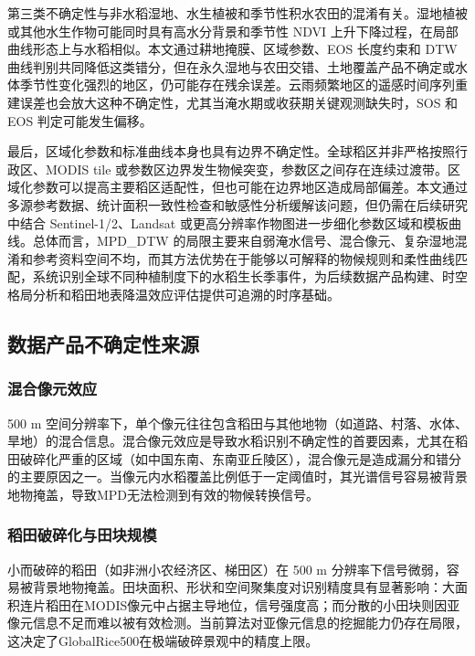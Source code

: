 第三类不确定性与非水稻湿地、水生植被和季节性积水农田的混淆有关。湿地植被或其他水生作物可能同时具有高水分背景和季节性 NDVI 上升下降过程，在局部曲线形态上与水稻相似\cite{Zhan2021}。本文通过耕地掩膜、区域参数、EOS 长度约束和 DTW 曲线判别共同降低这类错分，但在永久湿地与农田交错、土地覆盖产品不确定或水体季节性变化强烈的地区，仍可能存在残余误差。云雨频繁地区的遥感时间序列重建误差也会放大这种不确定性，尤其当淹水期或收获期关键观测缺失时，SOS 和 EOS 判定可能发生偏移。

最后，区域化参数和标准曲线本身也具有边界不确定性。全球稻区并非严格按照行政区、MODIS tile 或参数区边界发生物候突变，参数区之间存在连续过渡带。区域化参数可以提高主要稻区适配性，但也可能在边界地区造成局部偏差。本文通过多源参考数据、统计面积一致性检查和敏感性分析缓解该问题，但仍需在后续研究中结合 Sentinel-1/2、Landsat 或更高分辨率作物图进一步细化参数区域和模板曲线。总体而言，MPD\_DTW 的局限主要来自弱淹水信号、混合像元、复杂湿地混淆和参考资料空间不均，而其方法优势在于能够以可解释的物候规则和柔性曲线匹配，系统识别全球不同种植制度下的水稻生长季事件，为后续数据产品构建、时空格局分析和稻田地表降温效应评估提供可追溯的时序基础。
\subsection{数据产品不确定性来源}

\subsubsection{混合像元效应}

500 m 空间分辨率下，单个像元往往包含稻田与其他地物（如道路、村落、水体、旱地）的混合信息\cite{Dong2016}。混合像元效应是导致水稻识别不确定性的首要因素，尤其在稻田破碎化严重的区域（如中国东南、东南亚丘陵区），混合像元是造成漏分和错分的主要原因之一。当像元内水稻覆盖比例低于一定阈值时，其光谱信号容易被背景地物掩盖，导致MPD无法检测到有效的物候转换信号。

\subsubsection{稻田破碎化与田块规模}

小而破碎的稻田（如非洲小农经济区、梯田区）在 500 m 分辨率下信号微弱，容易被背景地物掩盖\cite{Onojeghuo2018}。田块面积、形状和空间聚集度对识别精度具有显著影响：大面积连片稻田在MODIS像元中占据主导地位，信号强度高；而分散的小田块则因亚像元信息不足而难以被有效检测。当前算法对亚像元信息的挖掘能力仍存在局限，这决定了GlobalRice500在极端破碎景观中的精度上限。


